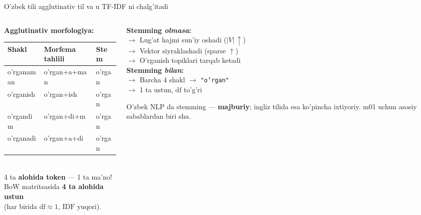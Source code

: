 \documentclass[aspectratio=169,11pt]{beamer}
\begin{document}
\begin{frame}{O'zbek tili agglutinativ til va u TF-IDF ni chalg'itadi}
  \begin{columns}[T]
    \begin{column}{0.50\textwidth}
      \textbf{Agglutinativ morfologiya:}\\[4pt]
      \small
      \begin{tabular}{lll}
        \toprule
        Shakl & Morfema tahlili & Stem \\
        \midrule
        o'rganaman & o'rgan+a+man & o'rgan \\
        o'rganish  & o'rgan+ish   & o'rgan \\
        o'rgandim  & o'rgan+di+m  & o'rgan \\
        o'rganadi  & o'rgan+a+di  & o'rgan \\
        \bottomrule
      \end{tabular}\\[5pt]
      \footnotesize
      4 ta \textbf{alohida token} --- 1 ta ma'no!\\
      BoW matritsasida \textbf{4 ta alohida ustun}\\
      (har birida $\mathrm{df}\approx 1$, $\mathrm{IDF}$ yuqori).
    \end{column}
    \begin{column}{0.46\textwidth}
      \textbf{Stemming \textit{olmasa}:}\\[3pt]
      \small
      $\to$ Lug'at hajmi sun'iy oshadi ($|V|\,\uparrow$)\\
      $\to$ Vektor siyraklashadi (sparse $\uparrow$)\\
      $\to$ O'rganish topiklari tarqab ketadi\\[5pt]
      \textbf{Stemming \textit{bilan}:}\\[3pt]
      $\to$ Barcha 4 shakl $\to$ \texttt{"o'rgan"}\\
      $\to$ 1 ta ustun, $\mathrm{df}$ to'g'ri\\[5pt]
      \begin{tcolorbox}[warnbox,title=Dars xulosasi,top=2pt,bottom=2pt]
        \footnotesize
        O'zbek NLP da stemming ---
        \textbf{majburiy}; ingliz tilida
        esa ko'pincha ixtiyoriy.
        m01 uchun asosiy sabablardan biri shu.
      \end{tcolorbox}
    \end{column}
  \end{columns}
\end{frame}
\end{document}
